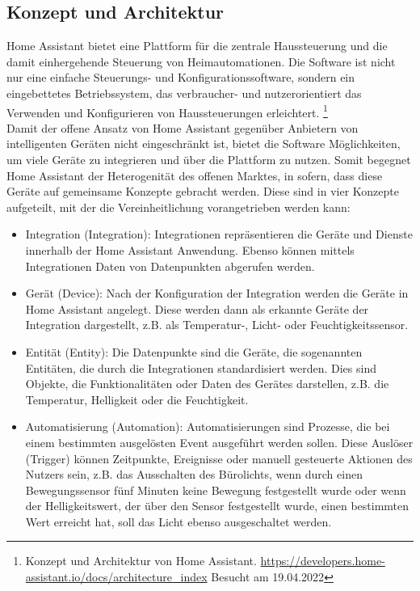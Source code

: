 \subsection{Konzept und Architektur}
\label{sec:conceptArchitectureHAOS}
    Home Assistant bietet eine Plattform für die zentrale Haussteuerung und die damit einhergehende Steuerung von Heimautomationen. Die 
    Software ist nicht nur eine einfache Steuerungs- und Konfigurationssoftware, sondern ein eingebettetes Betriebssystem, das 
    verbraucher- und nutzerorientiert das Verwenden und Konfigurieren von Haussteuerungen erleichtert. \footnote{Konzept und Architektur von Home Assistant. \url{https://developers.home-assistant.io/docs/architecture_index} Besucht am 19.04.2022}
    \\
    \linebreak
    Damit der offene Ansatz von Home Assistant gegenüber Anbietern von intelligenten Geräten nicht eingeschränkt ist, bietet die Software Möglichkeiten, um viele 
    Geräte zu integrieren und über die Plattform zu nutzen. Somit begegnet Home Assistant der Heterogenität des offenen Marktes, in sofern, dass diese Geräte auf  
    gemeinsame Konzepte gebracht werden. Diese sind in vier Konzepte %
    aufgeteilt, mit der die Vereinheitlichung vorangetrieben werden kann: 
    \begin{itemize}
        \item Integration (Integration): Integrationen repräsentieren die Geräte und Dienste innerhalb der Home Assistant Anwendung. 
              Ebenso können mittels Integrationen Daten von Datenpunkten abgerufen werden.
        \item Gerät (Device): Nach der Konfiguration der Integration werden die Geräte in Home Assistant angelegt. 
              Diese werden dann als erkannte Geräte der Integration dargestellt, z.B. als Temperatur-, Licht- oder Feuchtigkeitssensor.
        \item Entität (Entity): Die Datenpunkte sind die Geräte, die sogenannten Entitäten, die durch die Integrationen standardisiert werden. 
              Dies sind Objekte, die Funktionalitäten oder Daten des Gerätes darstellen, z.B. die Temperatur, Helligkeit oder die Feuchtigkeit.
        \item Automatisierung (Automation): Automatisierungen sind Prozesse, die bei einem bestimmten ausgelösten Event ausgeführt werden 
              sollen. Diese Auslöser (Trigger) können Zeitpunkte, Ereignisse oder manuell gesteuerte Aktionen des Nutzers sein, z.B. das 
              Ausschalten des Bürolichts, wenn durch einen Bewegungssensor fünf Minuten keine Bewegung festgestellt wurde oder wenn der 
              Helligkeitswert, der über den Sensor festgestellt wurde, einen bestimmten Wert erreicht hat, soll das Licht ebenso 
              ausgeschaltet werden.
    \end{itemize}
